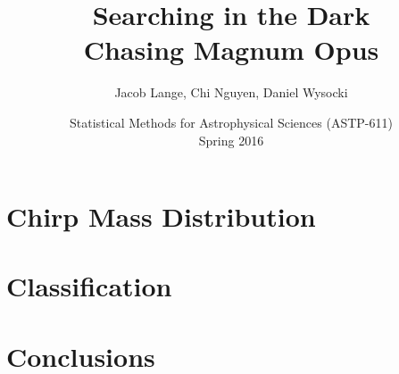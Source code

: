 \documentclass[DIV=calc, paper=a4, 11pt, twocolumn]{scrartcl}
\title{
\hspace{-0.75cm} Searching in the Dark
\\
Chasing Magnum Opus
}
\author{
  Jacob Lange, Chi Nguyen, Daniel Wysocki
}
\date{
  Statistical Methods for Astrophysical Sciences (ASTP-611)
  \\
  Spring 2016
}
\begin{document}
\maketitle

\thispagestyle{fancy} %





\section{Chirp Mass Distribution}
\label{sec:dist}






\section{Classification}
\label{sec:classifier}


\section{Conclusions}
\label{sec:conclusions}





\printbibliography
\end{document}
